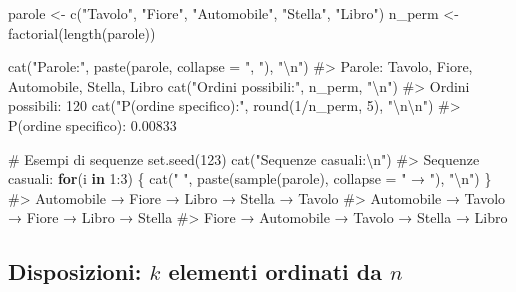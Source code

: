 \documentclass[
  letterpaper,
  DIV=11,
  numbers=noendperiod,
  oneside]{scrreprt}
\newenvironment{Shaded}{\begin{snugshade}}{\end{snugshade}}
\newcommand{\AttributeTok}[1]{\textcolor[rgb]{0.40,0.45,0.13}{#1}}
\newcommand{\CommentTok}[1]{\textcolor[rgb]{0.37,0.37,0.37}{#1}}
\newcommand{\ControlFlowTok}[1]{\textcolor[rgb]{0.00,0.23,0.31}{\textbf{#1}}}
\newcommand{\DecValTok}[1]{\textcolor[rgb]{0.68,0.00,0.00}{#1}}
\newcommand{\FunctionTok}[1]{\textcolor[rgb]{0.28,0.35,0.67}{#1}}
\newcommand{\NormalTok}[1]{\textcolor[rgb]{0.00,0.23,0.31}{#1}}
\newcommand{\OtherTok}[1]{\textcolor[rgb]{0.00,0.23,0.31}{#1}}
\newcommand{\SpecialCharTok}[1]{\textcolor[rgb]{0.37,0.37,0.37}{#1}}
\newcommand{\StringTok}[1]{\textcolor[rgb]{0.13,0.47,0.30}{#1}}
\theoremstyle{definition}
\theoremstyle{plain}
\theoremstyle{definition}
\theoremstyle{remark}
\begin{document}
\begin{Shaded}
\begin{Highlighting}[]
\NormalTok{parole }\OtherTok{\textless{}{-}} \FunctionTok{c}\NormalTok{(}\StringTok{"Tavolo"}\NormalTok{, }\StringTok{"Fiore"}\NormalTok{, }\StringTok{"Automobile"}\NormalTok{, }\StringTok{"Stella"}\NormalTok{, }\StringTok{"Libro"}\NormalTok{)}
\NormalTok{n\_perm }\OtherTok{\textless{}{-}} \FunctionTok{factorial}\NormalTok{(}\FunctionTok{length}\NormalTok{(parole))}

\FunctionTok{cat}\NormalTok{(}\StringTok{"Parole:"}\NormalTok{, }\FunctionTok{paste}\NormalTok{(parole, }\AttributeTok{collapse =} \StringTok{", "}\NormalTok{), }\StringTok{"}\SpecialCharTok{\textbackslash{}n}\StringTok{"}\NormalTok{)}
\CommentTok{\#\textgreater{} Parole: Tavolo, Fiore, Automobile, Stella, Libro}
\FunctionTok{cat}\NormalTok{(}\StringTok{"Ordini possibili:"}\NormalTok{, n\_perm, }\StringTok{"}\SpecialCharTok{\textbackslash{}n}\StringTok{"}\NormalTok{)}
\CommentTok{\#\textgreater{} Ordini possibili: 120}
\FunctionTok{cat}\NormalTok{(}\StringTok{"P(ordine specifico):"}\NormalTok{, }\FunctionTok{round}\NormalTok{(}\DecValTok{1}\SpecialCharTok{/}\NormalTok{n\_perm, }\DecValTok{5}\NormalTok{), }\StringTok{"}\SpecialCharTok{\textbackslash{}n\textbackslash{}n}\StringTok{"}\NormalTok{)}
\CommentTok{\#\textgreater{} P(ordine specifico): 0.00833}

\CommentTok{\# Esempi di sequenze}
\FunctionTok{set.seed}\NormalTok{(}\DecValTok{123}\NormalTok{)}
\FunctionTok{cat}\NormalTok{(}\StringTok{"Sequenze casuali:}\SpecialCharTok{\textbackslash{}n}\StringTok{"}\NormalTok{)}
\CommentTok{\#\textgreater{} Sequenze casuali:}
\ControlFlowTok{for}\NormalTok{(i }\ControlFlowTok{in} \DecValTok{1}\SpecialCharTok{:}\DecValTok{3}\NormalTok{) \{}
  \FunctionTok{cat}\NormalTok{(}\StringTok{" "}\NormalTok{, }\FunctionTok{paste}\NormalTok{(}\FunctionTok{sample}\NormalTok{(parole), }\AttributeTok{collapse =} \StringTok{" → "}\NormalTok{), }\StringTok{"}\SpecialCharTok{\textbackslash{}n}\StringTok{"}\NormalTok{)}
\NormalTok{\}}
\CommentTok{\#\textgreater{}   Automobile → Fiore → Libro → Stella → Tavolo }
\CommentTok{\#\textgreater{}   Automobile → Tavolo → Fiore → Libro → Stella }
\CommentTok{\#\textgreater{}   Fiore → Automobile → Tavolo → Stella → Libro}
\end{Highlighting}
\end{Shaded}

\subsection{\texorpdfstring{Disposizioni: \(k\) elementi ordinati da
\(n\)}{Disposizioni: k elementi ordinati da n}}\label{disposizioni-k-elementi-ordinati-da-n}
\end{document}

